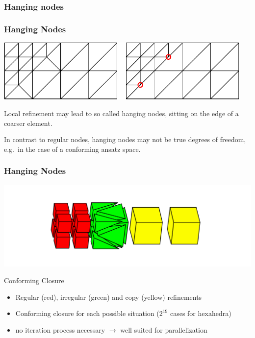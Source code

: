\subsubsection*{Hanging nodes}

\begin{frame}
  \frametitle<presentation>{Hanging Nodes}

  \begin{center}
    \includegraphics[width=0.95\textwidth]{EPS/adaptivity/hanging}
  \end{center}

  Local refinement may lead to so called hanging nodes, sitting on the edge of a coarser element.

  In contrast to regular nodes, hanging nodes may not be true degrees of freedom, e.g.~in the case of a conforming ansatz space.
\end{frame}

\begin{frame}
  \frametitle<presentation>{Hanging Nodes}
  \includegraphics[width=\linewidth]{EPS/adaptivity/hexclosurenew}

  \begin{block}{Conforming Closure}
    \begin{itemize}
      \item Regular (red), irregular (green) and copy (yellow) refinements
      \item Conforming closure for each possible situation ($2^{19}$ cases for hexahedra)
      \item no iteration process necessary $\rightarrow$ well suited for parallelization
    \end{itemize}
  \end{block}
\end{frame}

